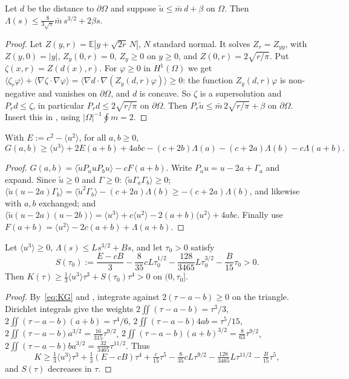 \documentclass[11pt,a4paper]{report}
\DeclareRobustCommand*{\avg}[1]{\langle #1\rangle}
\DeclareRobustCommand*{\ut}{\tilde u}
\begin{document}
\begin{lemma}[note=barrier]\label{lem:barrier}
Let \(d\) be the distance to \(\partial\Omega\) and suppose \(\ut\le\bar m\,d+\beta\) on \(\Omega\). Then
\(\Lambda(s)\le\frac{8}{3\sqrt\pi}\bar m\,s^{3/2}+2\beta s\).
\end{lemma}
\begin{proof}
Let \(Z(y,r)=\mathbb E|y+\sqrt{2r}\,N|\), \(N\) standard normal. It solves \(Z_r=Z_{yy}\), with \(Z(y,0)=|y|\), \(Z_y(0,r)=0\),
\(Z_y\ge0\) on \(y\ge0\), and \(Z(0,r)=2\sqrt{r/\pi}\). Put \(\zeta(x,r)=Z(d(x),r)\). For \(\varphi\ge0\) in \(H^1(\Omega)\) we get
\(\avg{\zeta_r\varphi}+\avg{\nabla\zeta\cdot\nabla\varphi}=\avg{\nabla d\cdot\nabla(Z_y(d,r)\varphi)}\ge0\): the function
\(Z_y(d,r)\varphi\) is non-negative and vanishes on \(\partial\Omega\), and \(d\) is concave. So \(\zeta\) is a supersolution and
\(P_rd\le\zeta\), in particular \(P_rd\le2\sqrt{r/\pi}\) on \(\partial\Omega\). Then \(P_r\ut\le\bar m\,2\sqrt{r/\pi}+\beta\) on
\(\partial\Omega\). Insert this in , using \(|\Omega|^{-1}\oint m=2\).
\end{proof}

\begin{proposition}\label{prop:G}
With \(E:=c^2-\avg{u^2}\), for all \(a,b\ge0\),
\[
G(a,b)\ge\avg{u^3}+2E(a+b)+4abc-(c+2b)\Lambda(a)-(c+2a)\Lambda(b)-c\Lambda(a+b).
\]
\end{proposition}
\begin{proof}
\(G(a,b)=\avg{\ut P_auP_bu}-cF(a+b)\). Write \(P_au=u-2a+\Gamma_a\) and expand. Since \(\ut\ge0\) and \(\Gamma\ge0\):
\(\avg{\ut\Gamma_a\Gamma_b}\ge0\); \(\avg{\ut(u-2a)\Gamma_b}=\avg{\ut^2\Gamma_b}-(c+2a)\Lambda(b)\ge-(c+2a)\Lambda(b)\), and likewise with
\(a,b\) exchanged; and \(\avg{\ut(u-2a)(u-2b)}=\avg{u^3}+c\avg{u^2}-2(a+b)\avg{u^2}+4abc\). Finally use
\(F(a+b)=\avg{u^2}-2c(a+b)+\Lambda(a+b)\).
\end{proof}

\begin{proposition}\label{prop:short}
Let \(\avg{u^3}\ge0\), \(\Lambda(s)\le Ls^{3/2}+Bs\), and let \(\tau_0>0\) satisfy
\begin{equation}\label{eq:S}
S(\tau_0):=\frac{E-cB}3-\frac8{35}cL\tau_0^{1/2}-\frac{128}{3465}L\tau_0^{3/2}-\frac B{15}\tau_0>0 .
\end{equation}
Then \(K(\tau)\ge\frac13\avg{u^3}\tau^3+S(\tau_0)\tau^4>0\) on \((0,\tau_0]\).
\end{proposition}
\begin{proof}
By~\eqref{eq:KG} and , integrate against \(2(\tau-a-b)\ge0\) on the triangle. Dirichlet integrals give the
weights \(2\iint(\tau-a-b)=\tau^3/3\), \(2\iint(\tau-a-b)(a+b)=\tau^4/6\), \(2\iint(\tau-a-b)4ab=\tau^5/15\),
\(2\iint(\tau-a-b)a^{3/2}=\frac{16}{315}\tau^{9/2}\), \(2\iint(\tau-a-b)(a+b)^{3/2}=\frac8{63}\tau^{9/2}\),
\(2\iint(\tau-a-b)ba^{3/2}=\frac{32}{3465}\tau^{11/2}\). Thus
\[
K\ge\tfrac13\avg{u^3}\tau^3+\tfrac13(E-cB)\tau^4+\tfrac c{15}\tau^5-\tfrac8{35}cL\tau^{9/2}-\tfrac{128}{3465}L\tau^{11/2}-\tfrac B{15}\tau^5,
\]
and \(S(\tau)\) decreases in \(\tau\).
\end{proof}
\end{document}
